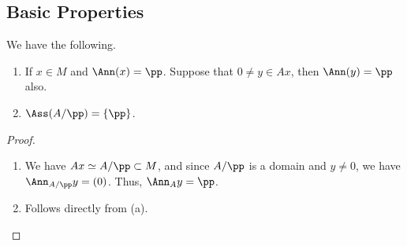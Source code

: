\subsection{Basic Properties}
\begin{proposition}
    \label{prop:basic_ass}
    We have the following.
    \begin{enumerate}[label=(\alph*)]
    \item If $x\in M$ and $\Ann(x)=\pp$.
	Suppose that $0\neq y\in Ax$, then $\Ann(y)=\pp$ also.
    \item $\Ass(A/\pp) = \{\pp\}$.
   \end{enumerate}
\end{proposition}
\begin{proof}
    \begin{enumerate}[label=(\alph*)]
    \item We have $Ax \simeq A/\pp\subset M$,
	and since $A/\pp$ is a domain and $y\neq 0$,
	we have $\Ann_{A/\pp} y = (0)$.
	Thus, $\Ann_A y = \pp$.
    \item Follows directly from (a). \qedhere
    \end{enumerate}
\end{proof}

